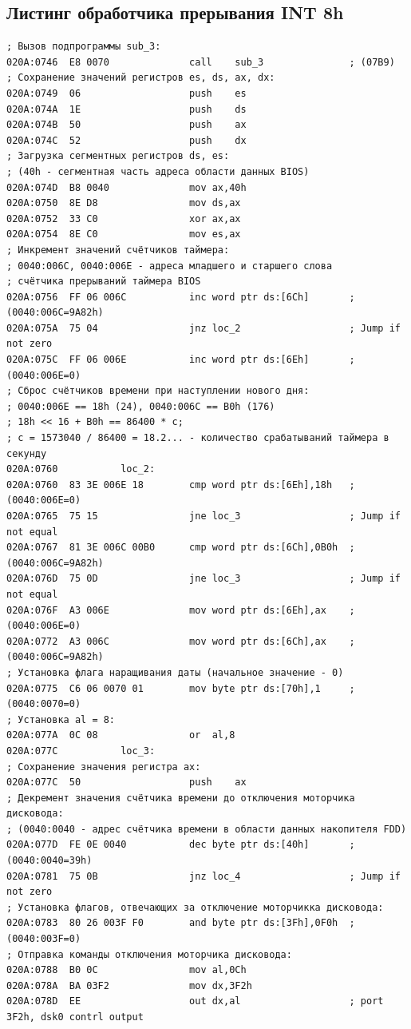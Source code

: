 \documentclass[a4paper,12pt]{article}
\begin{document}
\subsection{Листинг обработчика прерывания INT 8h} 
\begin{lstlisting}[style={asm}]
; Вызов подпрограммы sub_3:
020A:0746  E8 0070		  	    call	sub_3			    ; (07B9)
; Сохранение значений регистров es, ds, ax, dx:
020A:0749  06				    push	es
020A:074A  1E				    push	ds
020A:074B  50				    push	ax
020A:074C  52				    push	dx
; Загрузка сегментных регистров ds, es: 
; (40h - сегментная часть адреса области данных BIOS)
020A:074D  B8 0040			    mov	ax,40h
020A:0750  8E D8			    mov	ds,ax
020A:0752  33 C0			    xor	ax,ax
020A:0754  8E C0			    mov	es,ax
; Инкремент значений счётчиков таймера:
; 0040:006C, 0040:006E - адреса младшего и старшего слова 
; счётчика прерываний таймера BIOS
020A:0756  FF 06 006C		    inc	word ptr ds:[6Ch]	    ; (0040:006C=9A82h)
020A:075A  75 04			    jnz	loc_2			        ; Jump if not zero
020A:075C  FF 06 006E		    inc	word ptr ds:[6Eh]	    ; (0040:006E=0)
; Сброс счётчиков времени при наступлении нового дня:
; 0040:006E == 18h (24), 0040:006C == B0h (176)
; 18h << 16 + B0h == 86400 * c; 
; c = 1573040 / 86400 = 18.2... - количество срабатываний таймера в секунду
020A:0760			loc_2:
020A:0760  83 3E 006E 18	    cmp	word ptr ds:[6Eh],18h	; (0040:006E=0)
020A:0765  75 15			    jne	loc_3			        ; Jump if not equal
020A:0767  81 3E 006C 00B0	    cmp	word ptr ds:[6Ch],0B0h	; (0040:006C=9A82h)
020A:076D  75 0D			    jne	loc_3			        ; Jump if not equal
020A:076F  A3 006E			    mov	word ptr ds:[6Eh],ax	; (0040:006E=0)
020A:0772  A3 006C			    mov	word ptr ds:[6Ch],ax	; (0040:006C=9A82h)
; Установка флага наращивания даты (начальное значение - 0)
020A:0775  C6 06 0070 01	    mov	byte ptr ds:[70h],1	    ; (0040:0070=0)
; Установка al = 8:
020A:077A  0C 08			    or	al,8
020A:077C			loc_3:
; Сохранение значения регистра ax:
020A:077C  50				    push	ax
; Декремент значения счётчика времени до отключения моторчика дисковода:
; (0040:0040 - адрес счётчика времени в области данных накопителя FDD)
020A:077D  FE 0E 0040		    dec	byte ptr ds:[40h]	    ; (0040:0040=39h)
020A:0781  75 0B			    jnz	loc_4			        ; Jump if not zero
; Установка флагов, отвечающих за отключение моторчикка дисковода:
020A:0783  80 26 003F F0	    and	byte ptr ds:[3Fh],0F0h	; (0040:003F=0)
; Отправка команды отключения моторчика дисковода:
020A:0788  B0 0C			    mov	al,0Ch
020A:078A  BA 03F2			    mov	dx,3F2h
020A:078D  EE				    out	dx,al			        ; port 3F2h, dsk0 contrl output

\end{lstlisting}
\end{document}
